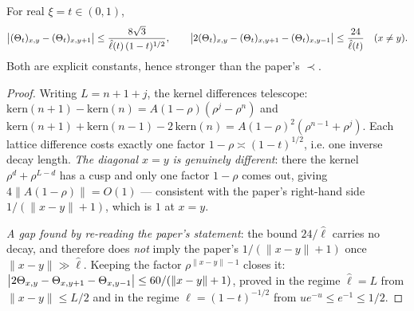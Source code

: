 \begin{lemma}\label{lem:Theta-diff}
  \leanok{}
  For real $\xi = t \in (0,1)$,
  \[ \bigl|(\Theta_t)_{x,y}-(\Theta_t)_{x,y+1}\bigr| \le \frac{8\sqrt3}{\hat\ell(t)\,(1-t)^{1/2}},
     \qquad
     \bigl|2(\Theta_t)_{x,y}-(\Theta_t)_{x,y+1}-(\Theta_t)_{x,y-1}\bigr| \le \frac{24}{\hat\ell(t)}
     \quad (x \ne y). \]
  Both are explicit constants, hence stronger than the paper's $\prec$.
\end{lemma}
\begin{proof}\leanok{}
  Writing $L = n+1+j$, the kernel differences telescope:
  $\mathrm{kern}(n{+}1)-\mathrm{kern}(n) = A(1-\rho)(\rho^j-\rho^n)$ and
  $\mathrm{kern}(n{+}1)+\mathrm{kern}(n{-}1)-2\,\mathrm{kern}(n) = A(1-\rho)^2(\rho^{n-1}+\rho^{j})$.
  Each lattice difference costs exactly one factor $1-\rho \asymp (1-t)^{1/2}$, i.e. one
  inverse decay length.  \emph{The diagonal $x = y$ is genuinely different}: there the
  kernel $\rho^d+\rho^{L-d}$ has a cusp and only one factor $1-\rho$ comes out, giving
  $4\|A(1-\rho)\| = O(1)$ --- consistent with the paper's right-hand side
  $1/(\|x-y\|+1)$, which is $1$ at $x = y$.

  \emph{A gap found by re-reading the paper's statement}: the bound $24/\hat\ell$ carries no
  decay, and therefore does \emph{not} imply the paper's $1/(\|x-y\|+1)$ once
  $\|x-y\|\gg\hat\ell$.  Keeping the factor $\rho^{\|x-y\|-1}$ closes it:
  $\bigl|2\Theta_{x,y}-\Theta_{x,y+1}-\Theta_{x,y-1}\bigr| \le 60/(\|x-y\|+1)$, proved in the regime
  $\hat\ell = L$ from $\|x-y\|\le L/2$ and in the regime $\hat\ell = (1-t)^{-1/2}$ from
  $u e^{-u}\le e^{-1}\le 1/2$.
\end{proof}

